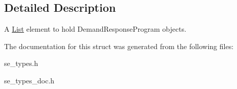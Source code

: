 \subsection{Detailed Description}
A \hyperlink{structList}{List} element to hold Demand\+Response\+Program objects. 

The documentation for this struct was generated from the following files\+:\begin{DoxyCompactItemize}
\item 
se\+\_\+types.\+h\item 
se\+\_\+types\+\_\+doc.\+h\end{DoxyCompactItemize}

